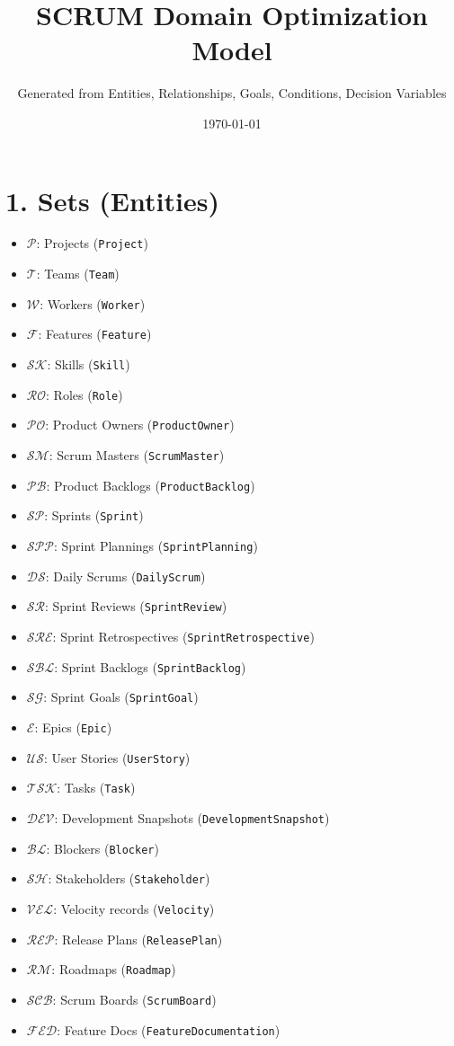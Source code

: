 \documentclass[11pt,a4paper]{article}
\title{SCRUM Domain Optimization Model}
\author{Generated from Entities, Relationships, Goals, Conditions, Decision Variables}
\date{\today}
\begin{document}
\maketitle
\tableofcontents
\newpage

\section{1. Sets (Entities)}
\begin{itemize}[leftmargin=2em]
  \item $\mathcal{P}$: Projects (\texttt{Project})
  \item $\mathcal{T}$: Teams (\texttt{Team})
  \item $\mathcal{W}$: Workers (\texttt{Worker})
  \item $\mathcal{F}$: Features (\texttt{Feature})
  \item $\mathcal{S\!K}$: Skills (\texttt{Skill})
  \item $\mathcal{R\!O}$: Roles (\texttt{Role})
  \item $\mathcal{P\!O}$: Product Owners (\texttt{ProductOwner})
  \item $\mathcal{S\!M}$: Scrum Masters (\texttt{ScrumMaster})
  \item $\mathcal{P\!B}$: Product Backlogs (\texttt{ProductBacklog})
  \item $\mathcal{S\!P}$: Sprints (\texttt{Sprint})
  \item $\mathcal{S\!PP}$: Sprint Plannings (\texttt{SprintPlanning})
  \item $\mathcal{D\!S}$: Daily Scrums (\texttt{DailyScrum})
  \item $\mathcal{S\!R}$: Sprint Reviews (\texttt{SprintReview})
  \item $\mathcal{S\!RE}$: Sprint Retrospectives (\texttt{SprintRetrospective})
  \item $\mathcal{S\!BL}$: Sprint Backlogs (\texttt{SprintBacklog})
  \item $\mathcal{S\!G}$: Sprint Goals (\texttt{SprintGoal})
  \item $\mathcal{E}$: Epics (\texttt{Epic})
  \item $\mathcal{U\!S}$: User Stories (\texttt{UserStory})
  \item $\mathcal{T\!S\!K}$: Tasks (\texttt{Task})
  \item $\mathcal{D\!E\!V}$: Development Snapshots (\texttt{DevelopmentSnapshot})
  \item $\mathcal{B\!L}$: Blockers (\texttt{Blocker})
  \item $\mathcal{S\!H}$: Stakeholders (\texttt{Stakeholder})
  \item $\mathcal{V\!E\!L}$: Velocity records (\texttt{Velocity})
  \item $\mathcal{R\!E\!P}$: Release Plans (\texttt{ReleasePlan})
  \item $\mathcal{R\!M}$: Roadmaps (\texttt{Roadmap})
  \item $\mathcal{S\!C\!B}$: Scrum Boards (\texttt{ScrumBoard})
  \item $\mathcal{F\!E\!D}$: Feature Docs (\texttt{FeatureDocumentation})
\end{itemize}
\end{document}
